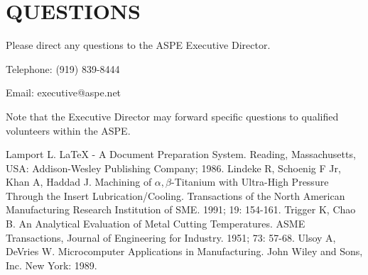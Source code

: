 \documentclass[letterpaper,10pt,twocolumn]{../aspe}
\begin{document}
\section*{QUESTIONS}
Please direct any questions to the ASPE Executive Director.
\begin{list}{}{\parsep=0pt\parskip=0pt}
    \item Telephone: (919) 839-8444
    \item Email: executive@aspe.net
\end{list}
Note that the Executive Director may forward specific questions to qualified
volunteers within the ASPE.

\begin{thebibliography}{23.}
    Lamport L. LaTeX - A Document Preparation System.
    Reading, Massachusetts, USA: Addison-Wesley Publishing Company; 1986.
    Lindeke R, Schoenig F Jr, Khan A, Haddad J.
    Machining of $\alpha,\beta$-Titanium with Ultra-High Pressure Through
    the Insert Lubrication/Cooling. Transactions of the North American
    Manufacturing Research Institution of SME. 1991; 19: 154-161.
    Trigger K, Chao B.  An Analytical
    Evaluation of Metal Cutting Temperatures. ASME Transactions, Journal of
    Engineering for Industry. 1951; 73: 57-68.
    Ulsoy A, DeVries W.
    Microcomputer Applications in Manufacturing.
    John Wiley and Sons, Inc.  New York: 1989.
\end{thebibliography}
\end{document}

